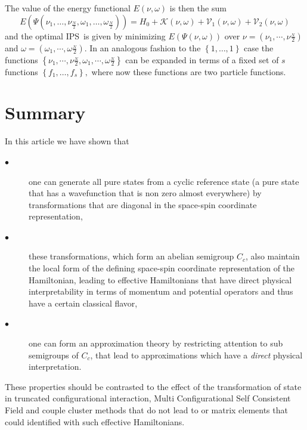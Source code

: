 \documentclass[aps,preprint]{revtex4}%
\begin{document}
The value of the energy functional $E\left(  \nu,\omega\right)  $ is then the
sum
\begin{equation}
E\left(  \mathcal{\Psi}\left(  \nu_{1},\ldots,\nu_{\frac{N}{2}},\omega
_{1},\ldots,\omega_{\frac{N}{2}}\right)  \right)  =H_{0}+\mathcal{K}\left(
\nu,\omega\right)  +\mathcal{V}_{1}\left(  \nu,\omega\right)  +\mathcal{V}%
_{2}\left(  \nu,\omega\right)
\end{equation}
and the optimal IPS\ is given by minimizing $E\left(  \mathcal{\Psi}\left(
\nu,\omega\right)  \right)  $ over $\nu=\left(  \nu_{1},\cdots,\nu\frac{_{N}%
}{2}\right)  $ and $\omega=\left(  \omega_{1},\cdots,\omega\frac{_{N}}%
{2}\right)  \mathsf{.}$ In an analogous fashion to the $\left\{
1,\ldots,1\right\}  $ case the functions $\left\{  \nu_{1},\cdots,\nu
\frac{_{N}}{2},\omega_{1},\cdots,\omega\frac{_{N}}{2}\right\}  $ can be
expanded in terms of a fixed set of $s$ functions $\left\{  f_{1},\ldots
,f_{s}\right\}  ,$ where now these functions are two particle functions.

\section{Summary\label{Sum}}

In this article we have shown that

\begin{description}
\item[$\bullet$] one can generate all pure states from a cyclic reference
state (a pure state that has a wavefunction that is non zero almost
everywhere) by transformations that are diagonal in the space-spin coordinate representation,

\item[$\bullet$] these transformations, which form an abelian semigroup
$C_{c}$, also maintain the local form of the defining space-spin coordinate
representation of the Hamiltonian, leading to effective Hamiltonians that have
direct physical interpretability in terms of momentum and potential operators
and thus have a certain classical flavor,

\item[$\bullet$] one can form an approximation theory by restricting attention
to sub semigroups of $C_{c}$, that lead to approximations which have a
\emph{direct} physical interpretation.
\end{description}

These properties should be contrasted to the effect of the transformation of
state in truncated configurational interaction, Multi Configurational Self
Consistent Field and couple cluster methods that do not lead to or matrix
elements that could identified with such effective Hamiltonians.
\end{document}
